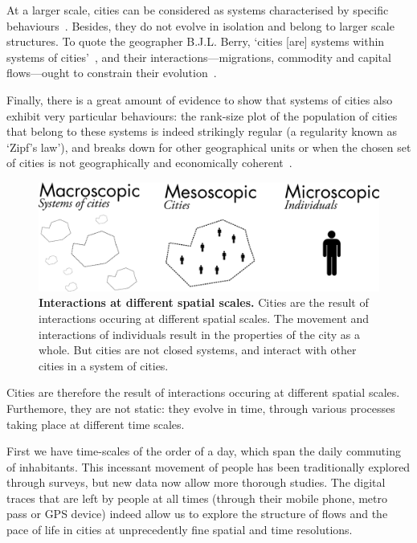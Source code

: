 At a larger scale, cities can be considered as systems characterised by specific
behaviours~\cite{Bettencourt:2007}. Besides, they do not evolve in isolation and
belong to larger scale structures. To quote the geographer B.J.L. Berry, `cities
[are] systems within systems of cities'~\cite{Berry:1964}, and their
interactions---migrations, commodity and capital flows---ought to constrain
their evolution~\cite{Pumain:2010}. 

Finally, there is a great amount of evidence to show that systems of cities also
exhibit very particular behaviours: the rank-size plot of the population of
cities that belong to these systems is indeed strikingly regular (a regularity
known as `Zipf's law'), and breaks down for other geographical units or when the
chosen set of cities is not geographically and economically
coherent~\cite{Cristelli:2012}.\\


\begin{figure}[!h]
    \centering
    \includegraphics[width=\textwidth]{./gfx/chapter-intro/spatial_scales.pdf}
    \caption{{\bf Interactions at different spatial scales.} Cities are the
    result of interactions occuring at different spatial scales. The movement
and interactions of individuals result in the properties of the city as a whole.
But cities are not closed systems, and interact with other cities in a system of
cities.\label{fig:spatialscale}}
\end{figure}


Cities are therefore the result of interactions occuring at different spatial
scales. Furthemore, they are not static: they evolve in time, through various
processes taking place at different time scales.

First we have time-scales of the order of a day, which span the daily commuting
of inhabitants. This incessant movement of people has been traditionally
explored through surveys, but new data now allow more thorough studies. The
digital traces that are left by people at all times (through their mobile phone,
metro pass or GPS device) indeed allow us to explore the structure of flows and
the pace of life in cities at unprecedently fine spatial and time resolutions.

